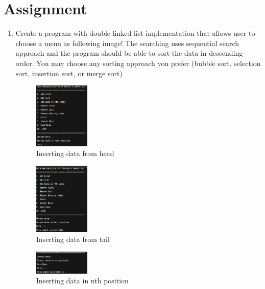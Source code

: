 \documentclass[12pt,titlepage]{article}
\begin{document}
\section*{Assignment}
\begin{enumerate}
    \item {
        Create a program with double linked list implementation that allows user to choose a menu as
        following image! The searching uses sequential search approach and the program should be
        able to sort the data in descending order. You may choose any sorting approach you prefer
        (bubble sort, selection sort, insertion sort, or merge sort)

        \begin{figure}[h]
            \centering
            \includegraphics[width=0.25\textwidth]{./images/1-1.png}
            \caption{Inserting data from head}
        \end{figure}

        \begin{figure}[h]
            \centering
            \includegraphics[width=0.25\textwidth]{./images/1-2.png}
            \caption{Inserting data from tail}
        \end{figure}

        \begin{figure}[h]
            \centering
            \includegraphics[width=0.25\textwidth]{./images/1-3.png}
            \caption{Inserting data in nth position}
        \end{figure}

}
\end{enumerate}
\end{document}
